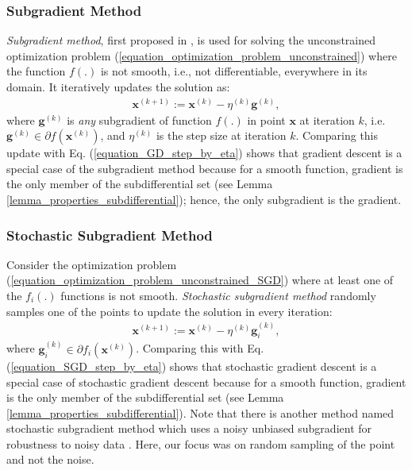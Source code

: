 \documentclass[lang=cn,10pt]{gorgeousnbook}
\numberwithin{equation}{section}%
\numberwithin{figure}{section}%
\begin{document}
\subsubsection{Subgradient Method}

\textit{Subgradient method}, first proposed in \cite{shor2012minimization}, is used for solving the unconstrained optimization problem (\ref{equation_optimization_problem_unconstrained}) where the function $f(.)$ is not smooth, i.e., not differentiable, everywhere in its domain. It iteratively updates the solution as:
\begin{align}
\boldsymbol{x}^{(k+1)} := \boldsymbol{x}^{(k)} - \eta^{(k)} \boldsymbol{g}^{(k)},
\end{align}
where $\boldsymbol{g}^{(k)}$ is \textit{any} subgradient of function $f(.)$ in point $\boldsymbol{x}$ at iteration $k$, i.e. $\boldsymbol{g}^{(k)} \in \partial f(\boldsymbol{x}^{(k)})$, and $\eta^{(k)}$ is the step size at iteration $k$. 
Comparing this update with Eq. (\ref{equation_GD_step_by_eta}) shows that gradient descent is a special case of the subgradient method because for a smooth function, gradient is the only member of the subdifferential set (see Lemma \ref{lemma_properties_subdifferential}); hence, the only subgradient is the gradient. 

\subsubsection{Stochastic Subgradient Method}

Consider the optimization problem (\ref{equation_optimization_problem_unconstrained_SGD}) where at least one of the $f_i(.)$ functions is not smooth.
\textit{Stochastic subgradient method} \cite{shor1998nondifferentiable} randomly samples one of the points to update the solution in every iteration:
\begin{align}\label{equation_SGD_step_by_eta_subgradient}
\boldsymbol{x}^{(k+1)} := \boldsymbol{x}^{(k)} - \eta^{(k)} \boldsymbol{g}_i^{(k)},
\end{align}
where $\boldsymbol{g}_i^{(k)} \in \partial f_i(\boldsymbol{x}^{(k)})$.
Comparing this with Eq. (\ref{equation_SGD_step_by_eta}) shows that stochastic gradient descent is a special case of stochastic gradient descent because for a smooth function, gradient is the only member of the subdifferential set (see Lemma \ref{lemma_properties_subdifferential}).
Note that there is another method named stochastic subgradient method which uses a noisy unbiased subgradient for robustness to noisy data \cite{boyd2008stochastic}. Here, our focus was on random sampling of the point and not the noise.  %
\end{document}
